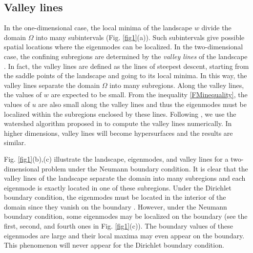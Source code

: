 \documentclass[a4paper,11pt]{article}
\begin{document}
\subsection{Valley lines}
In the one-dimensional case, the local minima of the landscape $w$ divide the domain $\Omega$ into many subintervals (Fig. \ref{fig1}(a)). Such subintervals give possible spatial locations where the eigenmodes can be localized. In the two-dimensional case, the confining subregions are determined by the \emph{valley lines} of the landscape \cite{filoche2012universal}. In fact, the valley lines are defined as the lines of steepest descent, starting from the saddle points of the landscape and going to its local minima. In this way, the valley lines separate the domain $\Omega$ into many subregions. Along the valley lines, the values of $w$ are expected to be small. From the inequality \eqref{FMinequality}, the values of $u$ are also small along the valley lines and thus the eigenmodes must be localized within the subregions enclosed by these lines.
Following \cite{filoche2012universal, arnold2016effective}, we use the watershed algorithm proposed in \cite{Soille1990Determining} to compute the valley lines numerically. In higher dimensions, valley lines will become hypersurfaces and the results are similar.

Fig. \ref{fig1}(b),(c) illustrate the landscape, eigenmodes, and valley lines for a two-dimensional problem under the Neumann boundary condition. It is clear that the valley lines of the landscape separate the domain into many subregions and each eigenmode is exactly located in one of these subregions. Under the Dirichlet boundary condition, the eigenmodes must be located in the interior of the domain since they vanish on the boundary \cite{filoche2012universal}. However, under the Neumann boundary condition, some eigenmodes may be localized on the boundary (see the first, second, and fourth ones in Fig. \ref{fig1}(c)). The boundary values of these eigenmodes are large and their local maxima may even appear on the boundary. This phenomenon will never appear for the Dirichlet boundary condition.
\end{document}
